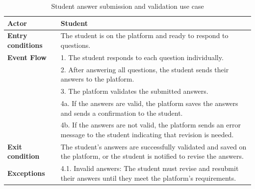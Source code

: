 \begin{table}[h!]
    \centering
    \begin{tabular}{lp{10cm}}
        \textbf{Actor} & Student \\ \hline
        \textbf{Entry conditions} & The student is on the platform and ready to respond to questions. \\ \hline
        \textbf{Event Flow} & 
        1. The student responds to each question individually. \\
        & 2. After answering all questions, the student sends their answers to the platform. \\
        & 3. The platform validates the submitted answers. \\
        & 4a. If the answers are valid, the platform saves the answers and sends a confirmation to the student. \\
        & 4b. If the answers are not valid, the platform sends an error message to the student indicating that revision is needed. \\
        \hline
        \textbf{Exit condition} & The student's answers are successfully validated and saved on the platform, or the student is notified to revise the answers. \\ \hline
        \textbf{Exceptions} & 
        4.1. Invalid answers: The student must revise and resubmit their answers until they meet the platform's requirements. \\
    \end{tabular}
    \caption{Student answer submission and validation use case}
    \label{tab:student_answer_submission}
\end{table}


